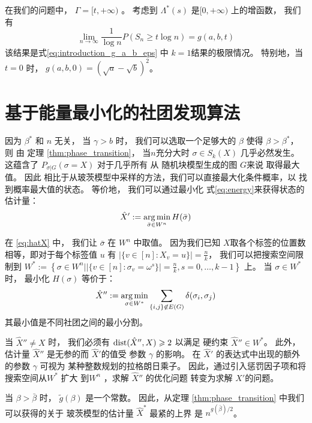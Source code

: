 在我们的问题中， $\Gamma=[t, +\infty)$ 。
考虑到 $\Lambda^*(s)$  是$[0,+\infty)$ 上的增函数，
我们有
\begin{equation}
  \lim_{n\to \infty} \frac{1}{\log n} P(S_n \ge t \log n)
  = g(a,b,t)
\end{equation}
该结果是式\eqref{eq:introduction_g_a_b_eps} 中 $k=1$结果的极限情况。
特别地，当$t=0$ 时， $g(a,b, 0) = \left(\sqrt{a} - \sqrt{b}\right)^2$。

\section{基于能量最小化的社团发现算法}\label{sec:em}
因为 $\beta^*$ 和 $n$ 无关，
当 $\gamma>b$ 时，
我们可以选取一个足够大的 $\beta$ 使得
$\beta > \beta^*$，
则 由 定理 \ref{thm:phase_transition}，
当$n$充分大时 $\sigma \in S_k(X)$ 几乎必然发生。
这蕴含了 $P_{\sigma | G}(\sigma = X)$
对于几乎所有 从 随机块模型生成的图  $G$来说 取得最大值。
因此
相比于从玻茨模型中采样的方法，我们可以直接最大化条件概率，以
找到概率最大值的状态。
等价地， 我们可以通过最小化 式\eqref{eq:energy}来获得状态的估计量：
\begin{equation}\label{eq:hatX}
\hat{X}' := \operatorname*{arg\,min}_{\bar{\sigma} \in W^n} H(\bar{\sigma})
\end{equation}

在 \eqref{eq:hatX} 中， 我们让 $\bar{\sigma}$ 在 $W^n$ 中取值。
因为我们已知 $X$取各个标签的位置数相等，即对于每个标签值 $u$
有 $|\{v \in [n] : X_v = u\}| = \frac{n}{k}$，
我们可以把搜索空间限制到
$W^*:= \left\{\sigma\in W^n \big\vert |\{v \in [n] : \sigma_v = \omega^s\}| = \frac{n}{k}, s=0,\dots, k-1 \right\}$
上。
当 $\sigma \in W^*$ 时， 最小化 $H(\sigma)$ 等价于：
\begin{equation}\label{eq:hatX_double_prime}
\hat{X}'' := \operatorname*{arg\,min}_{\sigma \in W^*} \sum_{\{i,j\} \not\in E(G) } \delta(\sigma_i, \sigma_j)
\end{equation}
其最小值是不同社团之间的最小分割。

当 $\hat{X}'' \neq X$ 时，
我们必须有  $\operatorname{dist}(\hat{X}'' ,X)\geqslant 2$
以满足 硬约束 $\hat{X}'' \in W^*$。
此外，估计量 $\hat{X}''$ 是无参的而 $\hat{X}'$的值受
参数 $\gamma$ 的影响。
在
$\hat{X}'$ 的表达式中出现的额外的参数 $\gamma$ 可视为
某种整数规划的拉格朗日乘子。
因此，通过引入惩罚因子项和将搜索空间从$W^*$ 扩大 到$W^n$
，求解 $\hat{X}''$
的优化问题 转变为求解 $\hat{X}'$的问题。

当 $\beta > \bar{\beta}$ 时，
$\tilde{g}(\beta)$ 是一个常数。
因此，从定理 \ref{thm:phase_transition} 中我们可以获得的关于
玻茨模型的估计量 $\hat{X}^*$ 最紧的上界
是  $n^{g(\bar{\beta})/2}$。

